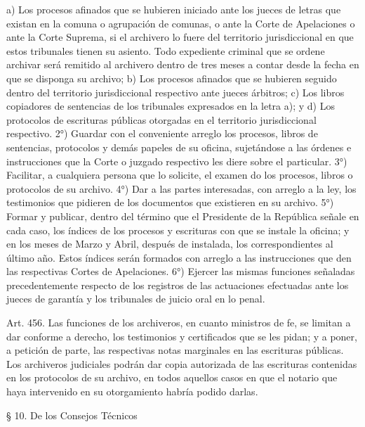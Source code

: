     a) Los procesos afinados que se hubieren iniciado ante los jueces de letras que existan en la comuna o agrupación de comunas, o ante la Corte de Apelaciones o ante la Corte Suprema, si el archivero lo fuere del territorio jurisdiccional en que estos tribunales tienen su asiento.
    Todo expediente criminal que se ordene archivar será remitido al archivero dentro de tres meses a contar desde la fecha en que se disponga su archivo;
    b) Los procesos afinados que se hubieren seguido dentro del territorio jurisdiccional respectivo ante jueces árbitros;
    c) Los libros copiadores de sentencias de los tribunales expresados en la letra a); y
    d) Los protocolos de escrituras públicas otorgadas en el territorio jurisdiccional respectivo.
    2°) Guardar con el conveniente arreglo los procesos, libros de sentencias, protocolos y demás papeles de su oficina, sujetándose a las órdenes e instrucciones que la Corte o juzgado respectivo les diere sobre el particular.
    3°) Facilitar, a cualquiera persona que lo solicite, el examen do los procesos, libros o protocolos de su archivo.
    4°) Dar a las partes interesadas, con arreglo a la ley, los testimonios que pidieren de los documentos que existieren en su archivo.
    5°) Formar y publicar, dentro del término que el Presidente de la República señale en cada caso, los índices de los procesos y escrituras con que se instale la oficina; y en los meses de Marzo y Abril, después de instalada, los correspondientes al último año.
    Estos índices serán formados con arreglo a las instrucciones que den las respectivas Cortes de Apelaciones.
    6°) Ejercer las mismas funciones señaladas precedentemente respecto de los registros de las actuaciones efectuadas ante los jueces de garantía y los tribunales de juicio oral en lo penal.



    Art. 456. Las funciones de los archiveros, en cuanto ministros de fe, se limitan a dar conforme a derecho, los testimonios y certificados que se les pidan; y a poner, a petición de parte, las respectivas notas marginales en las escrituras públicas.
    Los archiveros judiciales podrán dar copia autorizada de las escrituras contenidas en los protocolos de su archivo, en todos aquellos casos en que el notario que haya intervenido en su otorgamiento habría podido darlas.


    § 10. De los Consejos Técnicos



